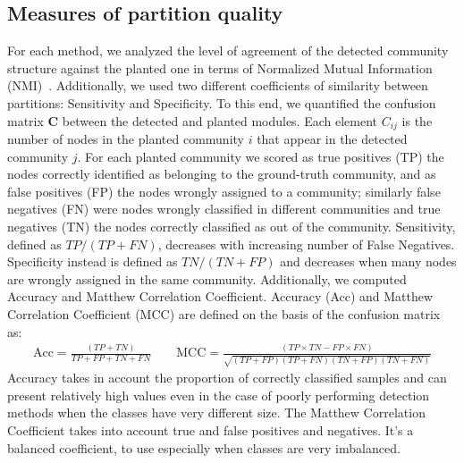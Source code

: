 \subsection{Measures of partition quality}
For each method, we analyzed the level of agreement of the detected community structure against the planted one in terms of Normalized Mutual Information (NMI)~\cite{danon2005}.
Additionally, we used two different coefficients of similarity between partitions: Sensitivity and Specificity. 
To this end, we quantified the confusion matrix $\mathbf{C}$ between the detected and planted modules. Each element $C_{ij}$ is the number of nodes in the planted community $i$ that appear in the detected community $j$.
For each planted community we scored as true positives (TP) the nodes correctly identified as belonging to the ground-truth community, and as false positives (FP) the nodes wrongly assigned to a community; similarly false negatives (FN) were nodes wrongly classified in different communities and true negatives (TN) the nodes correctly classified as out of the community.
Sensitivity, defined as $TP/(TP+FN)$, decreases with increasing number of False Negatives. Specificity instead is defined as $TN/(TN+FP)$ and decreases when many nodes are wrongly assigned in the same community.
Additionally, we computed Accuracy and Matthew Correlation Coefficient. Accuracy (Acc) and Matthew Correlation Coefficient (MCC) are defined on the basis of the confusion matrix as:
\begin{align*}
\textrm{Acc}=\frac{(TP+TN)}{TP+FP+TN+FN} \qquad \textrm{MCC}=\frac{(TP\times TN-FP\times FN)}{\sqrt{(TP+FP)(TP+FN)(TN+FP)(TN+FN)}}
\end{align*}
Accuracy takes in account the proportion of correctly classified samples and can present relatively high values even in the case of poorly performing detection methods when the classes have very different size.
The Matthew Correlation Coefficient  takes into account true and false positives and negatives. It's a balanced coefficient, to use especially when classes are very imbalanced.

